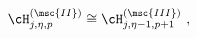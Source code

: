 \begin{equation}
\cH^{(\msc{II})}_{j,\eta,p} \cong \cH^{(\msc{III})}_{j,\eta-1,p+1}~,
\label{II III}
\end{equation}

